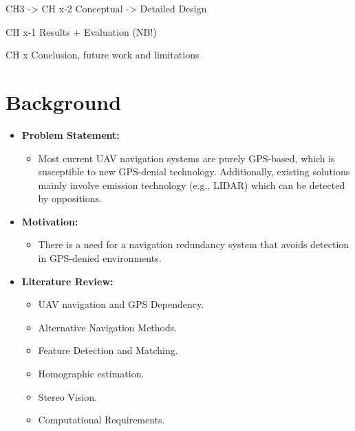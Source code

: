 CH3 -> CH x-2
Conceptual -> Detailed Design

CH x-1
Results + Evaluation (NB!)

CH x
Conclusion, future work and limitations



\section{Background}
\begin{itemize}
    \item \textbf{Problem Statement:}
    \begin{itemize}
        \item Most current UAV navigation systems are purely GPS-based, which is susceptible to new GPS-denial technology. Additionally, existing solutions mainly involve emission technology (e.g., LIDAR) which can be detected by oppositions.
    \end{itemize}
    \item \textbf{Motivation:}
    \begin{itemize}
        \item There is a need for a navigation redundancy system that avoids detection in GPS-denied environments.
    \end{itemize}
    \item \textbf{Literature Review:}
    \begin{itemize}
        \item UAV navigation and GPS Dependency.
        \item Alternative Navigation Methods.
        \item Feature Detection and Matching.
        \item Homographic estimation. 
        \item Stereo Vision. 
        \item Computational Requirements. 
    \end{itemize}
\end{itemize}

